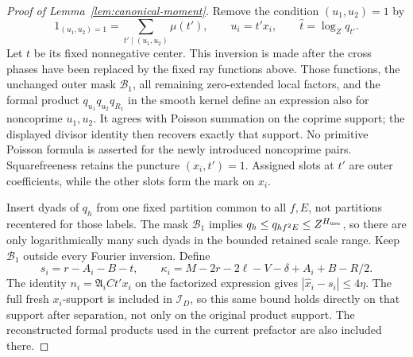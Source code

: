 \documentclass[11pt,a4paper]{article}
\numberwithin{equation}{section}
\numberwithin{figure}{section}
\theoremstyle{definition}
\theoremstyle{remark}
\begin{document}
\begin{proof}[Proof of Lemma~\ref{lem:canonical-moment}]
Remove the condition \((u_1,u_2)=1\) by
\[
 1_{(u_1,u_2)=1}=\sum_{t'\mid(u_1,u_2)}\mu(t'),\qquad u_i=t'x_i,
 \qquad \widehat t=\log_Zq_{t'}.
\]
Let \(t\) be its fixed nonnegative center.
This inversion is made after the cross phases have been replaced by
the fixed ray functions above.  Those functions, the unchanged outer
mask \(\mathcal B_1\), all remaining
zero-extended local factors, and the formal product
\(q_{u_1}q_{u_2}q_{R_1}\) in the smooth kernel define an expression
also for noncoprime \(u_1,u_2\).  It agrees with Poisson summation on
the coprime support; the displayed divisor identity then recovers
exactly that support.  No primitive Poisson formula is asserted for
the newly introduced noncoprime pairs.  Squarefreeness retains the
puncture \((x_i,t')=1\).  Assigned slots at \(t'\) are outer
coefficients, while the other slots form the mark on \(x_i\).

Insert dyads of \(q_h\) from one fixed partition common to all \(f,E\),
not partitions recentered for those labels.  The mask \(\mathcal B_1\)
implies \(q_h\le q_{hf^2E}\le Z^{H_{\rm use}}\), so there are only
logarithmically many such dyads in the bounded retained scale range.
Keep \(\mathcal B_1\) outside every Fourier inversion.  Define
\[
 s_i=r-A_i-B-t,\qquad
 \kappa_i=M-2r-2\ell-V-\delta+A_i+B-R/2.
\]
The identity \(n_i=\mathfrak A_iCt'x_i\) on the factorized expression
gives \(|\widehat x_i-s_i|\le4\eta\).  The full fresh \(x_i\)-support
is included in \(\mathcal I_D\), so this same bound holds directly on
that support after separation, not only on the original product support.
The reconstructed formal products used in the current prefactor are also
included there.


\end{proof}
\end{document}
